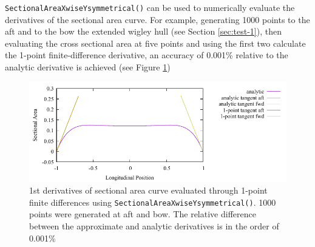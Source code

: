 \documentclass{report}
\begin{document}
\newpar \texttt{SectionalAreaXwiseYsymmetrical()} can be used to numerically evaluate the derivatives of the sectional area curve.
For example, generating 1000 points to the aft and to the bow the extended wigley hull (see Section \ref{sec:test-1}), then evaluating 
the cross sectional area at five points and using the first two calculate the 1-point finite-difference derivative, an accuracy of 
0.001\% relative to the analytic derivative is achieved (see Figure \ref{fig:test-2-1K-l-100-derivatives})
\begin{figure}[H]
    \centering
    \includegraphics[width=0.7\linewidth]{figures/test-2-1K-l-100-derivatives.pdf}
    \caption{1st derivatives of sectional area curve evaluated through 1-point finite differences using \texttt{SectionalAreaXwiseYsymmetrical()}. 
    1000 points were generated at aft and bow. The relative difference between the approximate
    and analytic derivatives is in the order of 0.001\%}
    \label{fig:test-2-1K-l-100-derivatives}
\end{figure}
\end{document}

